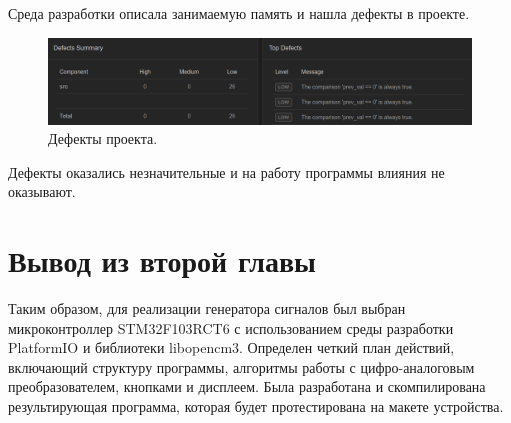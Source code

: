 	Среда разработки описала занимаемую память и нашла дефекты в проекте.
	
	\begin{figure}[H]
    \centering
    \includegraphics[width=1\textwidth]{../image/defects.png}
    \caption{Дефекты проекта.}
	\end{figure}
	
	Дефекты оказались незначительные и на работу программы влияния не оказывают.
	
\section{Вывод из второй главы}
	
	Таким образом, для реализации генератора сигналов был выбран микроконтроллер STM32F103RCT6 с использованием среды разработки PlatformIO и библиотеки libopencm3. Определен четкий план действий, включающий структуру программы, алгоритмы работы с цифро-аналоговым преобразователем, кнопками и дисплеем. Была разработана и скомпилирована результирующая программа, которая будет протестирована на макете устройства.

	
	
